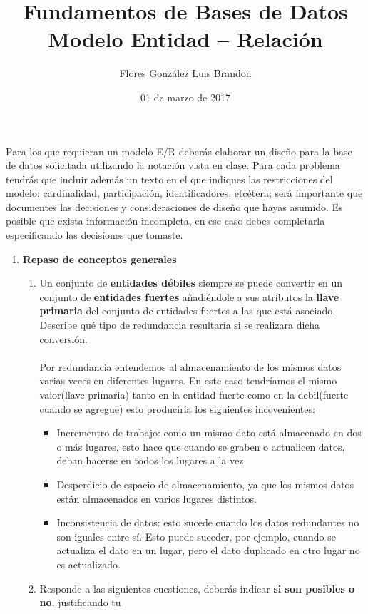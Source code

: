 \documentclass{article}
\title{Fundamentos de Bases de Datos \\ Modelo Entidad – Relación}
\author{Flores González Luis Brandon}
\date{01 de marzo de 2017}
\begin{document}
	\maketitle
	Para los que requieran un modelo E/R deberás elaborar un diseño para la base de datos solicitada
	utilizando la notación vista en clase. Para cada problema tendrás que incluir además un texto en el
	que indiques las restricciones del modelo: cardinalidad, participación, identificadores, etcétera; será
	importante que documentes las decisiones y consideraciones de diseño que hayas asumido. Es posible
	que exista información incompleta, en ese caso debes completarla especificando las decisiones que
	tomaste.
	
	\begin{enumerate}
		\item \textbf{Repaso de conceptos generales}
			\begin{enumerate}
				\item Un conjunto de \textbf{entidades débiles} siempre se puede convertir en un conjunto de \textbf{entidades fuertes}
				añadiéndole a sus atributos la \textbf{llave primaria} del conjunto de entidades fuertes a las que está
				asociado. Describe qué tipo de redundancia resultaría si se realizara dicha conversión.
				\\\\Por redundancia entendemos al almacenamiento de los mismos datos varias veces en diferentes lugares. En este caso tendríamos el mismo valor(llave primaria) tanto en la entidad fuerte como en la debil(fuerte cuando se agregue) esto produciría los siguientes incovenientes:
					\begin{itemize}
						\item Incrementro de trabajo: como un mismo dato está almacenado en dos o más lugares, esto hace que cuando se graben o actualicen datos, deban hacerse en todos los lugares a la vez.
						\item Desperdicio de espacio de almacenamiento, ya que los mismos datos están almacenados en varios lugares distintos.
						\item Inconsistencia de datos: esto sucede cuando los datos redundantes no son iguales entre sí. Esto puede suceder, por ejemplo, cuando se actualiza el dato en un lugar, pero el dato duplicado en otro lugar no es actualizado.\\
					\end{itemize}
				\item Responde a las siguientes cuestiones, deberás indicar \textbf{si son posibles o no}, justificando tu

\end{enumerate}
\end{enumerate}
\end{document}
